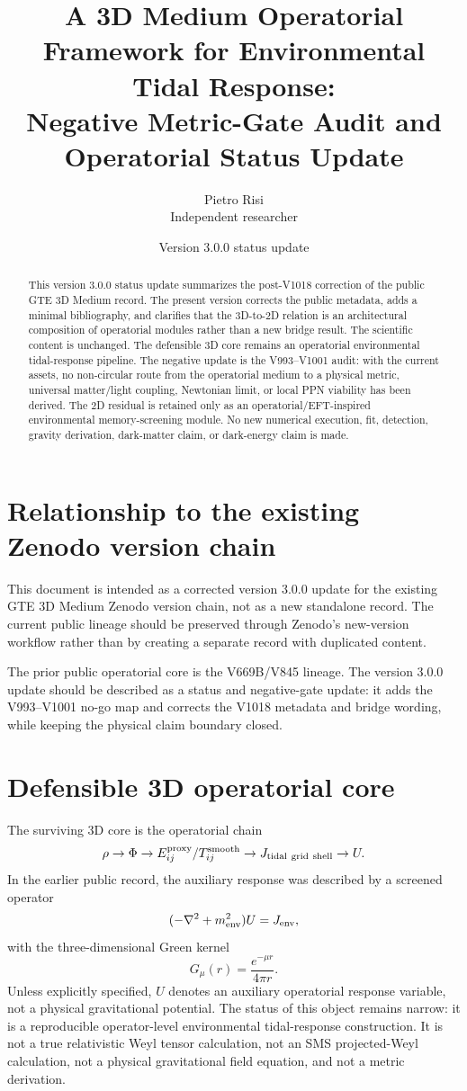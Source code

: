 \documentclass[11pt,a4paper]{article}
\title{A 3D Medium Operatorial Framework for Environmental Tidal Response:\\Negative Metric-Gate Audit and Operatorial Status Update}
\author{Pietro Risi\\Independent researcher}
\date{Version 3.0.0 status update}
\begin{document}
\maketitle
\begin{abstract}
This version 3.0.0 status update summarizes the post-V1018 correction of the public GTE 3D Medium record. The present version corrects the public metadata, adds a minimal bibliography, and clarifies that the 3D-to-2D relation is an architectural composition of operatorial modules rather than a new bridge result. The scientific content is unchanged. The defensible 3D core remains an operatorial environmental tidal-response pipeline. The negative update is the V993--V1001 audit: with the current assets, no non-circular route from the operatorial medium to a physical metric, universal matter/light coupling, Newtonian limit, or local PPN viability has been derived. The 2D residual is retained only as an operatorial/EFT-inspired environmental memory-screening module. No new numerical execution, fit, detection, gravity derivation, dark-matter claim, or dark-energy claim is made.
\end{abstract}

\section{Relationship to the existing Zenodo version chain}
This document is intended as a corrected version 3.0.0 update for the existing GTE 3D Medium Zenodo version chain, not as a new standalone record. The current public lineage should be preserved through Zenodo's new-version workflow rather than by creating a separate record with duplicated content.

The prior public operatorial core is the V669B/V845 lineage. The version 3.0.0 update should be described as a status and negative-gate update: it adds the V993--V1001 no-go map and corrects the V1018 metadata and bridge wording, while keeping the physical claim boundary closed.

\section{Defensible 3D operatorial core}
The surviving 3D core is the operatorial chain
\[
\rho \rightarrow \Phi \rightarrow E^{\rm proxy}_{ij}/T^{\rm smooth}_{ij} \rightarrow J_{\rm tidal\ grid\ shell} \rightarrow U.
\]
In the earlier public record, the auxiliary response was described by a screened operator
\[
(-\nabla^2 + m_{\rm env}^2)U = J_{\rm env},
\]
with the three-dimensional Green kernel
\[
G_\mu(r) = \frac{e^{-\mu r}}{4\pi r}.
\]
Unless explicitly specified, $U$ denotes an auxiliary operatorial response variable, not a physical gravitational potential. The status of this object remains narrow: it is a reproducible operator-level environmental tidal-response construction. It is not a true relativistic Weyl tensor calculation, not an SMS projected-Weyl calculation, not a physical gravitational field equation, and not a metric derivation.
\end{document}
